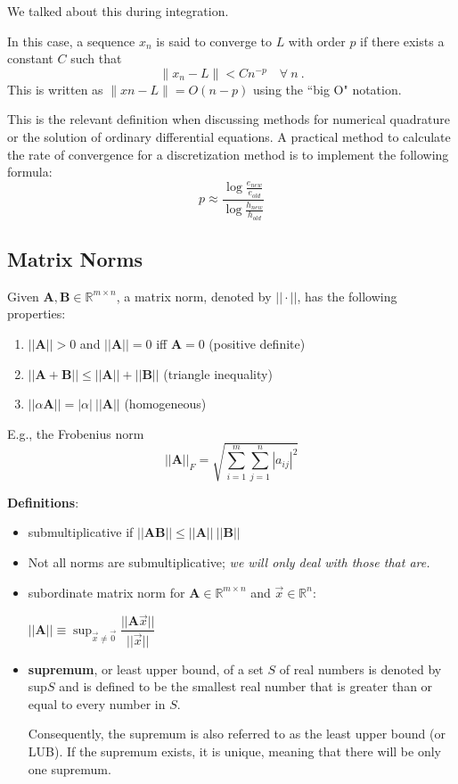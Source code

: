 \documentclass[12pt]{article}
\newcommand{\ve}[1]{\ensuremath{\mathbf{#1}}}
\begin{document}
We talked about this during integration.

In this case, a sequence $x_{n}$ is said to converge to $L$ with order $p$ if there exists a constant $C$ such that
\[ \|x_{n}-L\| < Cn^{-p} \quad \forall \:n\:.\]
This is written as $\|xn - L\| = O(n−p)$ using the ``big O" notation.

This is the relevant definition when discussing methods for numerical quadrature or the solution of ordinary differential equations. A practical method to calculate the rate of convergence for a discretization method is to implement the following formula:
\[ p\approx {\frac {\log {\frac {e_{new}}{e_{old}}}}{\log {\frac {h_{new}}{h_{old}}}}}\]



\subsection*{Matrix Norms}
Given $\ve{A}, \ve{B} \in \mathbb{R}^{m \times n}$, a matrix norm, denoted by $|| \cdot ||$, has the following properties:
%
\begin{enumerate}
\item $||\ve{A}|| > 0$ and $||\ve{A}|| = 0$ iff $\ve{A} = 0$ (positive definite)
\item $||\ve{A} + \ve{B}|| \leq ||\ve{A}|| + ||\ve{B}||$ (triangle inequality)
\item $||\alpha \ve{A}|| = |\alpha|\: ||\ve{A}||$ (homogeneous)
\end{enumerate}

E.g., the Frobenius norm 
%
\begin{equation}
||\ve{A}||_F = \sqrt{ \sum_{i=1}^m \sum_{j=1}^n |a_{ij}|^2 } \nonumber
\end{equation}

\textbf{Definitions}:
\begin{itemize}
\item submultiplicative if $||\ve{A} \ve{B}|| \leq ||\ve{A}||\: ||\ve{B}||$

\item Not all norms are submultiplicative; \textit{we will only deal with those that are.} 

\item subordinate matrix norm for $\ve{A} \in \mathbb{R}^{m \times n}$ and $\vec{x} \in \mathbb{R}^n$:

$||\ve{A}|| \equiv \displaystyle \sup_{\vec{x} \neq \vec{0}} \dfrac{||\ve{A}\vec{x}||}{||\vec{x}||}$

\item \textbf{supremum}, or least upper bound, of a set $S$ of real numbers is denoted by sup$S$ and is defined to be the smallest real number that is greater than or equal to every number in $S$.

Consequently, the supremum is also referred to as the least upper bound (or LUB). If the supremum exists, it is unique, meaning that there will be only one supremum. 
\end{itemize}
\end{document}
